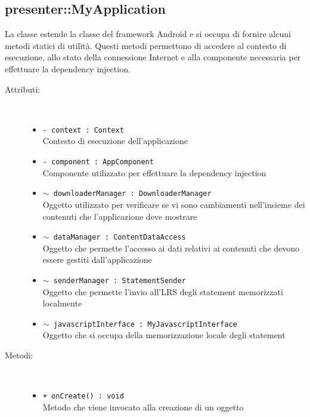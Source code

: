 \documentclass[../Tesi.tex]{subfiles}
\begin{document}
		\subsection{presenter::MyApplication}
		La classe  estende la classe  del framework Android e si occupa di fornire alcuni metodi statici di utilità. Questi metodi permettono di accedere al contesto di esecuzione, allo stato della connessione Internet e alla componente necessaria per effettuare la dependency injection.
		\begin{description}
			\item[Attributi:] \
			\begin{itemize}
				\item \texttt{- context : Context}\\
				Contesto di esecuzione dell'applicazione

				\item \texttt{- component : AppComponent}\\
				Componente utilizzato per effettuare la dependency injection

				\item \texttt{$\sim$ downloaderManager : DownloaderManager}\\
				Oggetto utilizzato per verificare se vi sono cambiamenti nell'insieme dei contenuti che l'applicazione deve mostrare

				\item \texttt{$\sim$ dataManager : ContentDataAccess}\\
				Oggetto che permette l'accesso ai dati relativi ai contenuti che devono essere gestiti dall'applicazione

				\item \texttt{$\sim$ senderManager : StatementSender}\\
				Oggetto che permette l'invio all'LRS degli statement memorizzati localmente

				\item \texttt{$\sim$ javascriptInterface : MyJavascriptInterface}\\
				Oggetto che si occupa della memorizzazione locale degli statement
			\end{itemize}

			\item[Metodi:] \
			\begin{itemize}
				\item \texttt{+ onCreate() : void}\\
				Metodo che viene invocato alla creazione di un oggetto 
				

\end{itemize}
\end{description}
\end{document}

